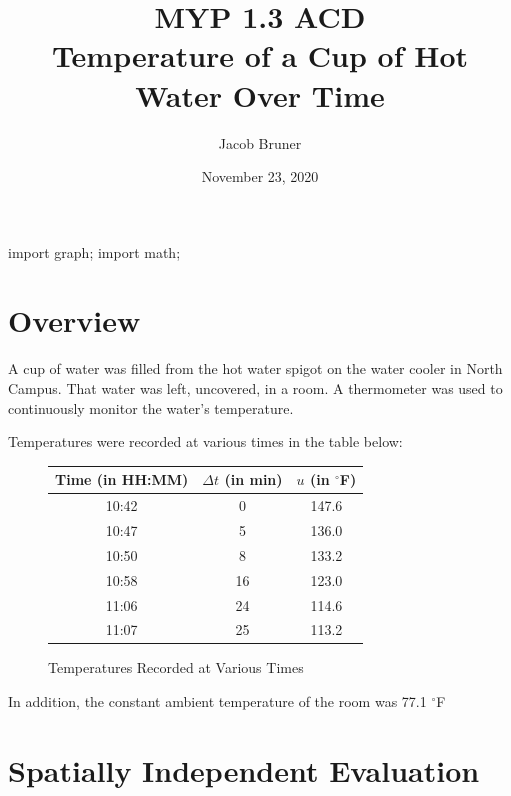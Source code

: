\documentclass[10pt]{article}
\begin{document}
\author{Jacob Bruner}
\title{MYP 1.3 ACD \\ Temperature of a Cup of Hot Water Over Time}
\date{November 23, 2020}
\maketitle

\begin{asydef}
import graph;
import math;
\end{asydef}



\section{Overview}

A cup of water was filled from the hot water spigot on the water cooler in North Campus. That water was left, uncovered, in a room. A thermometer was used to continuously monitor the water's temperature.

Temperatures were recorded at various times in the table below:

\begin{figure}[h]

\begin{center}
\begin{tabular}{|c c| c|}
	
	\hline
		Time (in HH:MM)& $\Delta t$  (in min) & $u$ (in $^\circ$F)
	\\ \hline \hline
		10:42 & 0 & 147.6\\
		10:47 & 5 & 136.0\\
		10:50 & 8 & 133.2\\
		10:58 & 16 & 123.0\\
		11:06 & 24 & 114.6\\
		11:07 & 25 & 113.2
	\\ \hline
\end{tabular}
\caption{Temperatures Recorded at Various Times}
\end{center}

\end{figure}
In addition, the constant ambient temperature of the room was 77.1 $^\circ$F


\section{Spatially Independent Evaluation}
\end{document}
